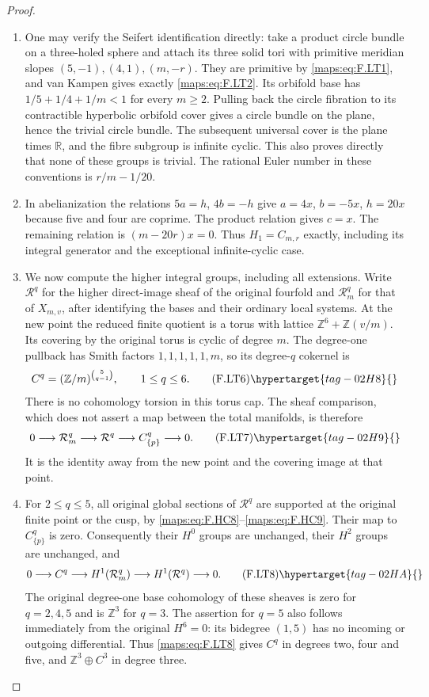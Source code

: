 \begin{proof}
\begin{enumerate}[label={$\langle1\rangle$\arabic*.}]
\item One may verify the Seifert identification directly:
take a product circle bundle on a three-holed sphere
and attach its three solid tori with primitive meridian
slopes $(5,-1),(4,1),(m,-r)$.
They are primitive by \eqref{maps:eq:F.LT1}, and van Kampen gives
exactly \eqref{maps:eq:F.LT2}.
Its orbifold base has
$1/5+1/4+1/m<1$ for every $m\ge2$.
Pulling back the circle fibration to its contractible
hyperbolic orbifold cover gives a circle bundle on
the plane, hence the trivial circle bundle.
The subsequent universal cover is the plane times
$\mathbb R$, and the fibre subgroup is infinite cyclic.
This also proves directly that none of these groups
is trivial.
The rational Euler number in these conventions is
$r/m-1/20$.

\item In abelianization the relations $5a=h$, $4b=-h$
give $a=4x$, $b=-5x$, $h=20x$ because five and four
are coprime.
The product relation gives $c=x$.
The remaining relation is $(m-20r)x=0$.
Thus $H_1=C_{m,r}$ exactly, including its integral
generator and the exceptional infinite-cyclic case.

\item We now compute the higher integral groups, including
all extensions.
Write $\mathcal R^q$ for the higher direct-image
sheaf of the original fourfold and
$\mathcal R_m^q$ for that of $X_{m,v}$, after identifying
the bases and their ordinary local systems.
At the new point the reduced finite quotient is a
torus with lattice
$\mathbb Z^6+\mathbb Z(v/m)$.
Its covering by the original torus is cyclic of
degree $m$.
The degree-one pullback has Smith factors
$1,1,1,1,1,m$, so its degree-$q$ cokernel is
\[
 C^q=(\mathbb Z/m)^{\binom5{q-1}},
 \qquad 1\le q\le6 .
\tag{F.LT6}\hypertarget{tag-02H8}{}\label{maps:eq:F.LT6}
\]
There is no cohomology torsion in this torus cap.
The sheaf comparison, which does not assert a map
between the total manifolds, is therefore
\[
 0\longrightarrow\mathcal R_m^q
  \longrightarrow\mathcal R^q
  \longrightarrow C^q_{\{p\}}\longrightarrow0 .
\tag{F.LT7}\hypertarget{tag-02H9}{}\label{maps:eq:F.LT7}
\]
It is the identity away from the new point and the
covering image at that point.

\item For $2\le q\le5$, all original global sections of
$\mathcal R^q$ are supported at the original finite
point or the cusp, by \eqref{maps:eq:F.HC8}--\eqref{maps:eq:F.HC9}.
Their map to $C^q_{\{p\}}$ is zero.
Consequently their $H^0$ groups are unchanged,
their $H^2$ groups are unchanged, and
\[
 0\longrightarrow C^q
  \longrightarrow H^1(\mathcal R_m^q)
  \longrightarrow H^1(\mathcal R^q)
  \longrightarrow0 .
\tag{F.LT8}\hypertarget{tag-02HA}{}\label{maps:eq:F.LT8}
\]
The original degree-one base cohomology of these
sheaves is zero for $q=2,4,5$ and is $\mathbb Z^3$
for $q=3$.
The assertion for $q=5$ also follows immediately
from the original $H^6=0$: its bidegree $(1,5)$
has no incoming or outgoing differential.
Thus \eqref{maps:eq:F.LT8} gives $C^q$ in degrees two, four and
five, and $\mathbb Z^3\oplus C^3$ in degree three.


\end{enumerate}
\end{proof}
